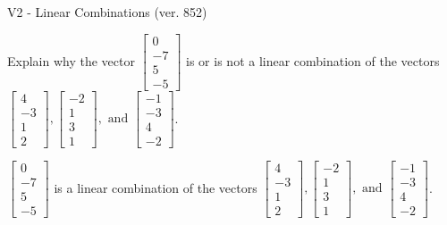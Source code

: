 \begin{exercise}
  \begin{exerciseTitle}V2 - Linear Combinations (ver. 852)\end{exerciseTitle}
  \begin{exerciseStatement}
    Explain why the vector \(\left[\begin{array}{c}
0 \\
-7 \\
5 \\
-5
\end{array}\right]\)  is or is not a linear 
	combination of the vectors \(\left[\begin{array}{c}
4 \\
-3 \\
1 \\
2
\end{array}\right] , \left[\begin{array}{c}
-2 \\
1 \\
3 \\
1
\end{array}\right] , \text{ and } \left[\begin{array}{c}
-1 \\
-3 \\
4 \\
-2
\end{array}\right]\).
	


  \end{exerciseStatement}
  \begin{exerciseAnswer}
   \(\left[\begin{array}{c}
0 \\
-7 \\
5 \\
-5
\end{array}\right]\) 
  	 is  
	a linear combination of the vectors \(\left[\begin{array}{c}
4 \\
-3 \\
1 \\
2
\end{array}\right] , \left[\begin{array}{c}
-2 \\
1 \\
3 \\
1
\end{array}\right] , \text{ and } \left[\begin{array}{c}
-1 \\
-3 \\
4 \\
-2
\end{array}\right]\).

	
  


  \end{exerciseAnswer}
\end{exercise}